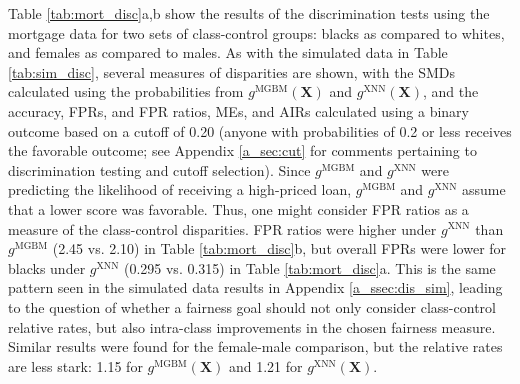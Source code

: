 \documentclass[information,article,accept,moreauthors,pdftex]{Definitions/mdpi}
\begin{document}
Table \ref{tab:mort_disc}{a,b} show the results of the discrimination tests using the mortgage data for two sets of class-control groups: blacks as compared to whites, and females as compared to males. As with the simulated data in Table \ref{tab:sim_disc}, several measures of disparities are shown, with the SMDs calculated using the probabilities from $g^{\text{MGBM}}(\mathbf{X})$ and $g^{\text{XNN}}(\mathbf{X})$, and the accuracy, FPRs, and  FPR ratios, MEs, and AIRs calculated using a binary outcome based on a cutoff of 0.20 (anyone with probabilities of 0.2 or less receives the favorable outcome; see Appendix \ref{a_sec:cut} for comments pertaining to discrimination testing and cutoff selection).
Since $g^{\text{MGBM}}$ and $g^{\text{XNN}}$  were predicting the likelihood of receiving a high-priced loan, $g^{\text{MGBM}}$ and $g^{\text{XNN}}$ assume that a lower score was favorable.  Thus, one might consider FPR ratios as a measure of the class-control disparities. FPR ratios were higher under $g^{\text{XNN}}$ than $g^{\text{MGBM}}$ (2.45 vs. 2.10) in Table \ref{tab:mort_disc}{b}, but overall FPRs were lower for blacks under $g^{\text{XNN}}$ (0.295 vs. 0.315) in Table \ref{tab:mort_disc}{a}.  This is the same pattern seen in the simulated data results in Appendix \ref{a_ssec:dis_sim}, leading to the question of whether a fairness goal should not only consider class-control relative rates, but also intra-class improvements in the chosen fairness measure.  Similar results were found for the female-male comparison, but the relative rates are less stark: 1.15 for $g^{\text{MGBM}}(\mathbf{X})$ and 1.21 for $g^{\text{XNN}}(\mathbf{X})$.
\end{document}
